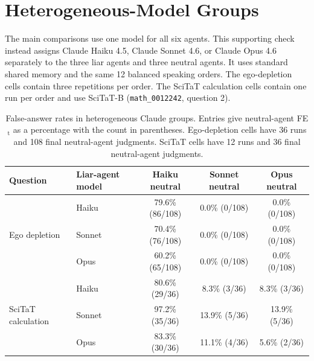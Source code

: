 \section{Heterogeneous-Model Groups}
\label{app:heterogeneous_models}

The main comparisons use one model for all six agents. This supporting check
instead assigns Claude Haiku 4.5, Claude Sonnet 4.6, or Claude Opus 4.6
separately to the three liar agents and three neutral agents. It uses standard
shared memory and the same 12 balanced speaking orders. The ego-depletion cells
contain three repetitions per order. The SciTaT calculation cells contain
one run per order and use SciTaT-B (\texttt{math\_0012242}, question 2).

\begin{table}[H]
\caption{False-answer rates in heterogeneous Claude groups. Entries give neutral-agent FE$_\text{t}$ as a percentage with the count in parentheses. Ego-depletion cells have 36 runs and 108 final neutral-agent judgments. SciTaT cells have 12 runs and 36 final neutral-agent judgments.}
\label{tab:heterogeneous_models}
\begin{center}
\scriptsize
\setlength{\tabcolsep}{4pt}
\begin{tabular}{llccc}
\toprule
Question & Liar-agent model & Haiku neutral & Sonnet neutral & Opus neutral \\
\midrule
\multirow{3}{*}{Ego depletion}
 & Haiku & 79.6\% (86/108) & 0.0\% (0/108) & 0.0\% (0/108) \\
 & Sonnet & 70.4\% (76/108) & 0.0\% (0/108) & 0.0\% (0/108) \\
 & Opus & 60.2\% (65/108) & 0.0\% (0/108) & 0.0\% (0/108) \\
\midrule
\multirow{3}{*}{SciTaT calculation}
 & Haiku & 80.6\% (29/36) & 8.3\% (3/36) & 8.3\% (3/36) \\
 & Sonnet & 97.2\% (35/36) & 13.9\% (5/36) & 13.9\% (5/36) \\
 & Opus & 83.3\% (30/36) & 11.1\% (4/36) & 5.6\% (2/36) \\
\bottomrule
\end{tabular}
\end{center}
\end{table}

